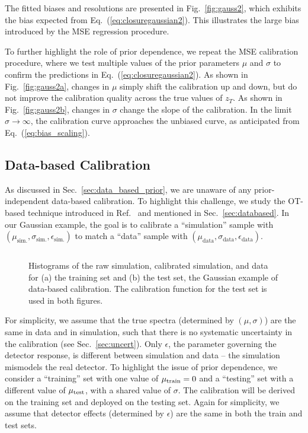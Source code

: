\documentclass[aps,prd,reprint,preprintnumbers,superscriptaddress,nofootinbib,longbibliography,floatfix]{revtex4-1}
\DeclareRobustCommand{\Sec}[1]{Sec.~\ref{sec:#1}}
\DeclareRobustCommand{\Fig}[1]{Fig.~\ref{fig:#1}}
\DeclareRobustCommand{\Eq}[1]{Eq.~(\ref{eq:#1})}
\DeclareRobustCommand{\Ref}[1]{Ref.~\cite{#1}}
\begin{document}
The fitted biases and resolutions are presented in \Fig{gauss2}, which exhibits the bias expected from \Eq{closuregaussian2}.
%
This illustrates the large bias introduced by the MSE regression procedure.

To further highlight the role of prior dependence, we repeat the MSE calibration procedure, where we test multiple values of the prior parameters $\mu$ and $\sigma$ to confirm the predictions in \Eq{closuregaussian2}.
%
As shown in \Fig{gauss2a}, changes in $\mu$ simply shift the calibration up and down, but do not improve the calibration quality across the true values of $z_T$.
%
As shown in \Fig{gauss2b}, changes in $\sigma$ change the slope of the calibration.
%
In the limit $\sigma\rightarrow \infty$, the calibration curve approaches the unbiased curve, as anticipated from \Eq{bias_scaling}.




\subsection{Data-based Calibration}
\label{sec:dataGauss}


As discussed in \Sec{data_based_prior}, we are unaware of any prior-independent data-based calibration.
%
To highlight this challenge, we study the OT-based technique introduced in \Ref{Pollard:2021fqv} and mentioned in \Sec{databased}.
%
In our Gaussian example, the goal is to calibrate a ``simulation'' sample with $(\mu_\text{sim.},\sigma_\text{sim.},\epsilon_\text{sim.})$ to match a ``data'' sample with $(\mu_\text{data},\sigma_\text{data},\epsilon_\text{data})$.

\begin{figure*}[t]
    \centering
    $\qquad$
    \caption{
    Histograms of the raw simulation, calibrated simulation, and data for (a) the training set and (b) the test set, the Gaussian example of data-based calibration.
    The calibration function for the test set is used in both figures.}
    \label{fig:gauss3}
\end{figure*}


For simplicity, we assume that the true spectra (determined by $(\mu,\sigma)$) are the same in data and in simulation, such that there is no systematic uncertainty in the calibration (see \Sec{uncert}). 
%
Only $\epsilon$, the parameter governing the detector response, is different between simulation and data -- the simulation mismodels the real detector.
%
To highlight the issue of prior dependence, we consider a ``training'' set with one value of $\mu_{\rm train} = 0$ and a ``testing'' set with a different value of $\mu_{\rm test}$, with a shared value of $\sigma$.
%
The calibration will be derived on the training set and deployed on the testing set.
%
Again for simplicity, we assume that detector effects (determined by $\epsilon$) are the same in both the train and test sets.
\end{document}

